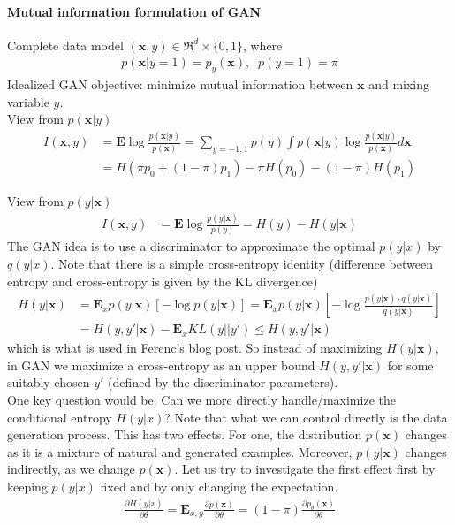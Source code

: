 \documentclass{article}
\newcommand{\x}{{\mathbf x}}
\begin{document}
\paragraph{Mutual information formulation of GAN}

Complete data model $(\x,y) \in \Re^d \times \{0,1\}$, where 
\begin{align}
p(\x|y=1) = p_y(\x), \;\; p(y=1) = \pi
\end{align}
Idealized GAN objective: minimize mutual information between $\x$ and mixing variable $y$.\\[3mm]

\noindent View from $p(\x|y)$
\begin{align}
I(\x,y) & = \mathbf E \log \frac{p(\x|y)}{p(\x)} 
= \sum_{y=-1,1} p(y) \int p(\x|y) \log \frac{p(\x|y)}{p(\x)}d\x \nonumber \\
& = H(\pi p_0 + (1-\pi) p_1) - \pi H(p_0)  - (1-\pi) H(p_1) 
\end{align}

\noindent View from $p(y|\x)$
\begin{align}
I(\x,y) & = \mathbf E \log \frac{p(y|\x)}{p(y)} = H(y) - H(y|\x) 
\end{align}
The GAN idea is to use a discriminator to approximate the optimal $p(y|x)$ by $q(y|x)$. 
Note that there is a simple cross-entropy identity (difference between entropy and cross-entropy is given by the KL divergence)
\begin{align}
H(y|\x) & = \mathbf E_x p(y|\x) \left[ -\log p(y|\x) \right] = 
\mathbf E_x p(y|\x) \left[ -\log \frac{p(y|\x) \cdot q(y|\x)}{q(y|\x)} \right] \\
& = H(y,y'|\x) - \mathbf E_x KL(y||y') \le H(y,y'|\x) 
\end{align}
which is what is used in Ferenc's blog post. So instead of maximizing $H(y|\x)$, in GAN we maximize a cross-entropy as an upper bound $H(y,y'|\x)$ for some suitably chosen $y'$ (defined by the discriminator parameters).\\

One key question would be: Can we more directly handle/maximize the conditional entropy $H(y|x)$? Note that what we can control directly is the data generation process. This has two effects. For one, the distribution $p(\x)$ changes as it is a mixture of natural and generated examples. Moreover, $p(y|\x)$ changes indirectly, as we change $p(\x)$. Let us try to investigate the first effect first by keeping $p(y|x)$ fixed and by only changing the expectation.  
\begin{align}
\frac{\partial H(y|x)}{\partial \theta}
= \mathbf E_{x,y} \frac{\partial p(\x)}{\partial \theta} = (1-\pi) \frac{\partial p_\theta(\x)}{\partial \theta} 
\end{align}
\end{document}
